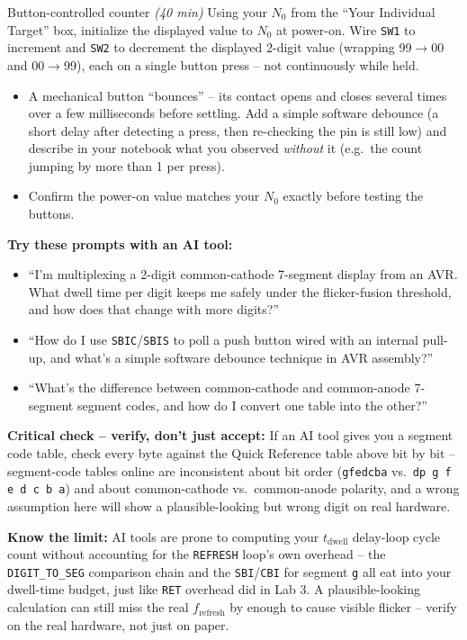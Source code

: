 \documentclass[11pt]{article}
\begin{document}
\begin{labexercise}{Button-controlled counter \hfill {\small \itshape (40 min)}}
Using your $N_0$ from the ``Your Individual Target'' box, initialize the displayed
value to $N_0$ at power-on. Wire \texttt{SW1} to increment and \texttt{SW2} to
decrement the displayed 2-digit value (wrapping 99$\to$00 and 00$\to$99), each on a
single button press -- not continuously while held.
\begin{itemize}[nosep,leftmargin=*]
  \item A mechanical button ``bounces'' -- its contact opens and closes several
        times over a few milliseconds before settling. Add a simple software debounce
        (a short delay after detecting a press, then re-checking the pin is still
        low) and describe in your notebook what you observed \emph{without} it
        (e.g.\ the count jumping by more than 1 per press).
  \item Confirm the power-on value matches your $N_0$ exactly before testing the
        buttons.
\end{itemize}
\end{labexercise}

\begin{aicollab}
\textbf{Try these prompts with an AI tool:}
\begin{itemize}[leftmargin=*,nosep]
  \item ``I'm multiplexing a 2-digit common-cathode 7-segment display from an AVR.
        What dwell time per digit keeps me safely under the flicker-fusion
        threshold, and how does that change with more digits?''
  \item ``How do I use \texttt{SBIC}/\texttt{SBIS} to poll a push button wired with
        an internal pull-up, and what's a simple software debounce technique in AVR
        assembly?''
  \item ``What's the difference between common-cathode and common-anode 7-segment
        segment codes, and how do I convert one table into the other?''
\end{itemize}

\medskip\textbf{Critical check -- verify, don't just accept:}
If an AI tool gives you a segment code table, check every byte against the Quick
Reference table above bit by bit -- segment-code tables online are inconsistent
about bit order (\texttt{gfedcba} vs.\ \texttt{dp\,g\,f\,e\,d\,c\,b\,a}) and about
common-cathode vs.\ common-anode polarity, and a wrong assumption here will show a
plausible-looking but wrong digit on real hardware.

\medskip\textbf{Know the limit:}
AI tools are prone to computing your $t_{\text{dwell}}$ delay-loop cycle count
without accounting for the \texttt{REFRESH} loop's own overhead -- the
\texttt{DIGIT\_TO\_SEG} comparison chain and the \texttt{SBI}/\texttt{CBI} for
segment \texttt{g} all eat into your dwell-time budget, just like \texttt{RET}
overhead did in Lab 3. A plausible-looking calculation can still miss the real
$f_{\text{refresh}}$ by enough to cause visible flicker -- verify on the real
hardware, not just on paper.
\end{aicollab}
\end{document}
